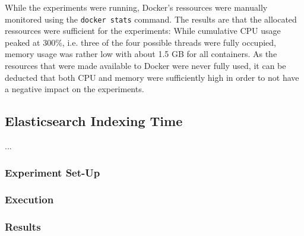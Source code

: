 While the experiments were running, Docker's ressources were manually monitored using the \texttt{docker stats} command.
The results are that the allocated ressources were sufficient for the experiments:
While cumulative CPU usage peaked at 300\%, i.e. three of the four possible threads were fully occupied, memory usage was rather low with about 1.5 GB for all containers.
As the resources that were made available to Docker were never fully used, it can be deducted that both CPU and memory were sufficiently high in order to not have a negative impact on the experiments.

\subsection{Elasticsearch Indexing Time}
\label{subsec:evaluation:performance:elasticsearch}

...

\subsubsection{Experiment Set-Up}


\subsubsection{Execution}

\subsubsection{Results}


